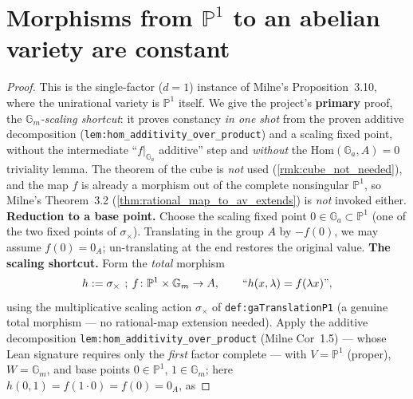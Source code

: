 \section{Morphisms from \(\mathbb P^1\) to an abelian variety are constant}
\begin{proof}
  This is the single-factor (\(d = 1\)) instance of Milne's Proposition~3.10, where the
  unirational variety is \(\mathbb P^1\) itself. We give the project's \textbf{primary} proof, the
  \emph{\(\mathbb G_m\)-scaling shortcut}: it proves constancy \emph{in one shot} from the proven
  additive decomposition (\texttt{lem:hom_additivity_over_product}) and a scaling fixed point,
  without the intermediate ``\(f|_{\mathbb G_a}\) additive'' step and \emph{without} the
  \(\mathrm{Hom}(\mathbb G_a, A) = 0\) triviality lemma. The theorem of the cube is \emph{not} used
  (\cref{rmk:cube_not_needed}), and the map \(f\) is already a morphism out of the complete
  nonsingular \(\mathbb P^1\), so Milne's Theorem~3.2 (\cref{thm:rational_map_to_av_extends}) is
  \emph{not} invoked either.
  \textbf{Reduction to a base point.} Choose the scaling fixed point \(0 \in \mathbb G_a \subset
  \mathbb P^1\) (one of the two fixed points of \(\sigma_\times\)). Translating in the group \(A\) by
  \(-f(0)\), we may assume \(f(0) = 0_A\); un-translating at the end restores the original value.
  \textbf{The scaling shortcut.} Form the \emph{total} morphism
  \[ h := \sigma_\times \fatsemi f \colon \mathbb P^1 \times \mathbb G_m \to A, \qquad
     \text{``}h(x, \lambda) = f(\lambda x)\text{''}, \]
  using the multiplicative scaling action \(\sigma_\times\) of \texttt{def:gaTranslationP1} (a genuine
  total morphism --- no rational-map extension needed). Apply the additive decomposition
  \texttt{lem:hom_additivity_over_product} (Milne Cor~1.5) --- whose Lean signature requires only the
  \emph{first} factor complete --- with \(V = \mathbb P^1\) (proper), \(W = \mathbb G_m\), and base
  points \(0 \in \mathbb P^1\), \(1 \in \mathbb G_m\); here \(h(0, 1) = f(1 \cdot 0) = f(0) = 0_A\), as

\end{proof}
